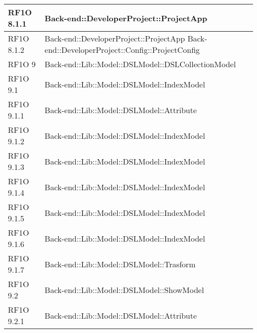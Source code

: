 \begin{center}
\begin{longtable}{ | p{3cm} | p{11cm} | }
    RF1O 8.1.1 & Back-end::DeveloperProject::ProjectApp \newline  \\ \hline      
    RF1O 8.1.2 & Back-end::DeveloperProject::ProjectApp \newline Back-end::DeveloperProject::Config::ProjectConfig \newline  \\ \hline        
           
    RF1O 9 & Back-end::Lib::Model::DSLModel::DSLCollectionModel\newline  \\ \hline      
    
    RF1O 9.1 & Back-end::Lib::Model::DSLModel::IndexModel \newline  \\ \hline   
       
    RF1O 9.1.1 & Back-end::Lib::Model::DSLModel::Attribute \newline  \\ \hline      
    
    RF1O 9.1.2 & Back-end::Lib::Model::DSLModel::IndexModel \newline  \\ \hline      
    
    RF1O 9.1.3 &  Back-end::Lib::Model::DSLModel::IndexModel \newline  \\ \hline   
       
    RF1O 9.1.4 & Back-end::Lib::Model::DSLModel::IndexModel \newline  \\ \hline 
         
    RF1O 9.1.5 & Back-end::Lib::Model::DSLModel::IndexModel \newline  \\ \hline      
    
    RF1O 9.1.6 & Back-end::Lib::Model::DSLModel::IndexModel \newline  \\ \hline      
    
    RF1O 9.1.7 & Back-end::Lib::Model::DSLModel::Trasform \newline  \\ \hline
          
    RF1O 9.2 & Back-end::Lib::Model::DSLModel::ShowModel \newline  \\ \hline   
       
    RF1O 9.2.1 & Back-end::Lib::Model::DSLModel::Attribute \newline  \\ \hline      
    

\end{longtable}
\end{center}
